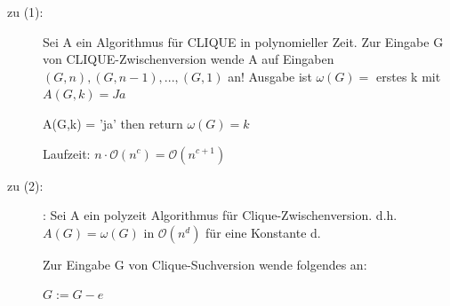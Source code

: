 \documentclass{article} %
\begin{document}
\begin{description}
\item[zu (1):] Sei A ein Algorithmus für CLIQUE in polynomieller Zeit.
Zur Eingabe G von CLIQUE-Zwischenversion wende A auf Eingaben $(G,n), (G,n-1),...,(G,1)$ an!
Ausgabe ist $\omega (G) =$ erstes k mit $A(G,k) = Ja$

\begin{algorithmic}[1]
	\If A(G,k) = 'ja'
	then return $\omega (G) = k $
	\EndIf
\EndFor
\end{algorithmic}
Laufzeit: $n \cdot \mathcal{O}(n^c) = \mathcal{O}(n^{c+1})$


\item[zu (2):]: Sei A ein polyzeit Algorithmus für Clique-Zwischenversion.
d.h. $A(G) = \omega (G)$ in $\mathcal{O}(n^d)$ für eine Konstante d.

Zur Eingabe G von Clique-Suchversion wende folgendes an:
\begin{algorithmic}[1]
	 $G := G - e$
	\EndIf
\EndFor
\State {}
\end{algorithmic}
\end{description}
\end{document}

